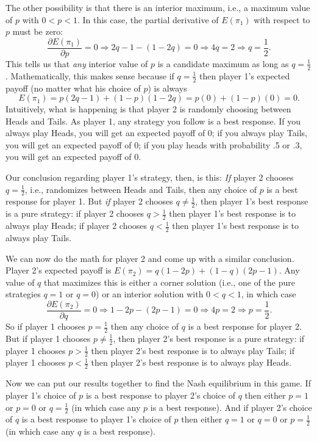 The other possibility is that there is an interior maximum, i.e., a maximum value of $p$ with $0<p<1$. In this case, the partial derivative of $E(\pi_1)$ with respect to $p$ must be zero:
\[
\frac{\partial E(\pi_1)}{\partial p} = 0\Longrightarrow
2q-1-(1-2q)=0\Longrightarrow 4q=2\Longrightarrow q=\frac{1}{2}.
\]
%
This tells us that \emph{any} interior value of $p$ is a candidate maximum as long as $q=\frac{1}{2}$. Mathematically, this makes sense because if $q=\frac{1}{2}$ then player 1's expected payoff (no matter what his choice of $p$) is always
\[
E(\pi_1)=p(2q-1)+(1-p)(1-2q)=p(0)+(1-p)(0)=0.
\]
Intuitively, what is happening is that player 2 is randomly choosing between Heads and Tails. As player 1, any strategy you follow is a best response. If you always play Heads, you will get an expected payoff of 0; if you always play Tails, you will get an expected payoff of 0; if you play heads with probability .5 or .3, you will get an expected payoff of 0.

Our conclusion regarding player 1's strategy, then, is this: \emph{If} player 2 chooses $q=\frac{1}{2}$, i.e., randomizes between Heads and Tails, then any choice of $p$ is a best response for player 1. But \emph{if} player 2 chooses $q\neq\frac{1}{2}$, then player 1's best response is a pure strategy: if player 2 chooses $q>\frac{1}{2}$ then player 1's best response is to always play Heads; if player 2 chooses $q<\frac{1}{2}$ then player 1's best response is to always play Tails.

We can now do the math for player 2 and come up with a similar conclusion. Player 2's expected payoff is $E(\pi_2)=q(1-2p)+(1-q)(2p-1).$ Any value of $q$ that maximizes this is either a corner solution (i.e., one of the pure strategies $q=1$ or $q=0$) or an interior solution with $0<q<1$, in which case
\[
\frac{\partial E(\pi_2)}{\partial q} = 0\Longrightarrow
1-2p-(2p-1)=0\Longrightarrow 4p=2\Longrightarrow p=\frac{1}{2}.
\]
%
So if player 1 chooses $p=\frac{1}{2}$ then any choice of $q$ is a best response for player 2. But if player 1 chooses $p\neq\frac{1}{2}$, then player 2's best response is a pure strategy: if player 1 chooses $p>\frac{1}{2}$ then player 2's best response is to always play Tails; if player 1 chooses $p<\frac{1}{2}$ then player 2's best response is to always play Heads.

Now we can put our results together to find the Nash equilibrium in this game. If player 1's choice of $p$ is a best response to player 2's choice of $q$ then either $p=1$ or $p=0$ or $q=\frac{1}{2}$ (in which case any $p$ is a best response). And if player 2's choice of $q$ is a best response to player 1's choice of $p$ then either $q=1$ or $q=0$ or $p=\frac{1}{2}$ (in which case any $q$ is a best response).

